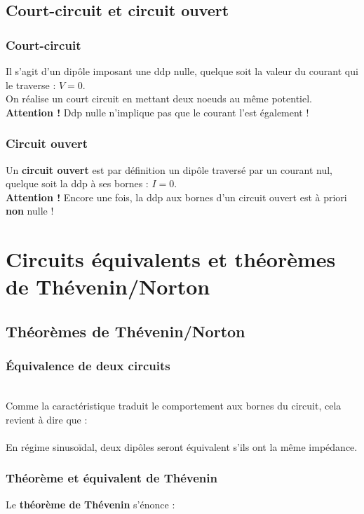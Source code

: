 \subsection{Court-circuit et circuit ouvert}
\subsubsection{Court-circuit}
Il s'agit d'un dipôle imposant une ddp nulle, quelque soit la valeur du courant qui le traverse : $V = 0$.\\ On réalise un court circuit en mettant deux noeuds au même potentiel.
\textbf{Attention !} Ddp nulle n'implique pas que le courant l'est également !

\subsubsection{Circuit ouvert}
Un \textbf{circuit ouvert} est par définition un dipôle traversé par un courant nul, quelque soit la ddp à ses bornes : $I =0$.\\
\textbf{Attention !} Encore une fois, la ddp aux bornes d'un circuit ouvert est à priori \textbf{non} nulle !




\newpage
\section{Circuits équivalents et théorèmes de Thévenin/Norton}
\subsection{Théorèmes de Thévenin/Norton}
\subsubsection{Équivalence de deux circuits}
\ \\

Comme la caractéristique traduit le comportement aux bornes du circuit, cela revient à dire que :\\
\ \\

En régime sinusoïdal, deux dipôles seront équivalent s'ils ont la même impédance.


\subsubsection{Théorème et équivalent de Thévenin}
Le \textbf{théorème de Thévenin} s'énonce :\\


